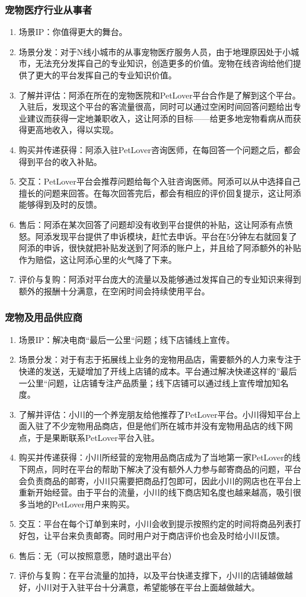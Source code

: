 \documentclass[a4paper]{ctexart}
\begin{document}
\subsubsection{宠物医疗行业从事者}
\begin{enumerate}[label=\alph*.]
  \item 场景IP：你值得更大的舞台。
  \item 场景分发：对于N线小城市的从事宠物医疗服务人员，由于地理原因处于小城市，无法充分发挥自己的专业知识，创造更多的价值。宠物在线咨询给他们提供了更大的平台发挥自己的专业知识价值。
  \item 了解并评估：阿添在所在的宠物医院和PetLover平台合作是了解到这个平台。入驻后，发现这个平台的客流量很高，同时可以通过空闲时间回答问题给出专业建议而获得一定地兼职收入，这让阿添的目标——给更多地宠物看病从而获得更高地收入，得以实现。
  \item 购买并传递获得：阿添入驻PetLover咨询医师，在每回答一个问题之后，都会得到平台的收入补贴。
  \item 交互：PetLover平台会推荐问题给每个入驻咨询医师。阿添可以从中选择自己擅长的问题来回答。在每次回答完后，都会有相应的评价回复提示，这让阿添能够得到及时的反馈。
  \item 售后：阿添在某次回答了问题却没有收到平台提供的补贴，这让阿添有点愤怒。阿添发现平台提供了申诉模块，赶忙去申诉。平台在5分钟左右就回复了阿添的申诉，很快就把补贴发送到了阿添的账户上，并且给了阿添额外的补贴作为赔偿，这让阿添心里的火气降了下来。
  \item 评价与复购：阿添对平台庞大的流量以及能够通过发挥自己的专业知识来得到额外的报酬十分满意，在空闲时间会持续使用平台。
\end{enumerate}
\subsubsection{宠物及用品供应商}
\begin{enumerate}[label=\alph*.]
  \item 场景IP：解决电商“最后一公里“问题；线下店铺线上宣传。
  \item 场景分发：对于有志于拓展线上业务的宠物用品店，需要额外的人力来专注于快递的发送，无疑增加了开线上店铺的成本。平台通过解决快递这样的”最后一公里“问题，让店铺专注产品质量；线下店铺可以通过线上宣传增加知名度。
  \item 了解并评估：小川的一个养宠朋友给他推荐了PetLover平台。小川得知平台上面入驻了不少宠物用品商店，但是他们所在城市并没有宠物用品店的线下网点，于是果断联系PetLover平台入驻。
  \item 购买并传递获得：小川所经营的宠物用品商店成为了当地第一家PetLover的线下网点，同时在平台的帮助下解决了没有额外人力参与邮寄商品的问题，平台会负责商品的邮寄，小川只需要把商品打包即可，因此小川的网店也在平台上重新开始经营。由于平台的流量，小川的线下商店知名度也越来越高，吸引很多当地的PetLover用户来购买。
  \item 交互：平台在每个订单到来时，小川会收到提示按照约定的时间将商品列表打好包，让平台来负责邮寄。同时用户对于商店评价也会及时给小川反馈。
  \item 售后：无（可以按照意愿，随时退出平台）
  \item 评价与复购：在平台流量的加持，以及平台快递支撑下，小川的店铺越做越好，小川对于入驻平台十分满意，希望能够在平台上面越做越大。
\end{enumerate}
\end{document}

